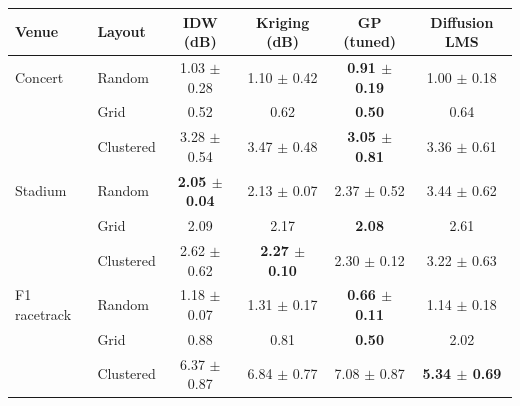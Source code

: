 \begin{tabular}{llcccc}
\toprule
Venue & Layout & IDW (dB) & Kriging (dB) & GP (tuned) & Diffusion LMS \\
\midrule
Concert & Random & 1.03 $\pm$ 0.28 & 1.10 $\pm$ 0.42 & \textbf{0.91 $\pm$ 0.19} & 1.00 $\pm$ 0.18 \\
 & Grid & 0.52 & 0.62 & \textbf{0.50} & 0.64 \\
 & Clustered & 3.28 $\pm$ 0.54 & 3.47 $\pm$ 0.48 & \textbf{3.05 $\pm$ 0.81} & 3.36 $\pm$ 0.61 \\
\midrule
Stadium & Random & \textbf{2.05 $\pm$ 0.04} & 2.13 $\pm$ 0.07 & 2.37 $\pm$ 0.52 & 3.44 $\pm$ 0.62 \\
 & Grid & 2.09 & 2.17 & \textbf{2.08} & 2.61 \\
 & Clustered & 2.62 $\pm$ 0.62 & \textbf{2.27 $\pm$ 0.10} & 2.30 $\pm$ 0.12 & 3.22 $\pm$ 0.63 \\
\midrule
F1 racetrack & Random & 1.18 $\pm$ 0.07 & 1.31 $\pm$ 0.17 & \textbf{0.66 $\pm$ 0.11} & 1.14 $\pm$ 0.18 \\
 & Grid & 0.88 & 0.81 & \textbf{0.50} & 2.02 \\
 & Clustered & 6.37 $\pm$ 0.87 & 6.84 $\pm$ 0.77 & 7.08 $\pm$ 0.87 & \textbf{5.34 $\pm$ 0.69} \\
\bottomrule
\end{tabular}
